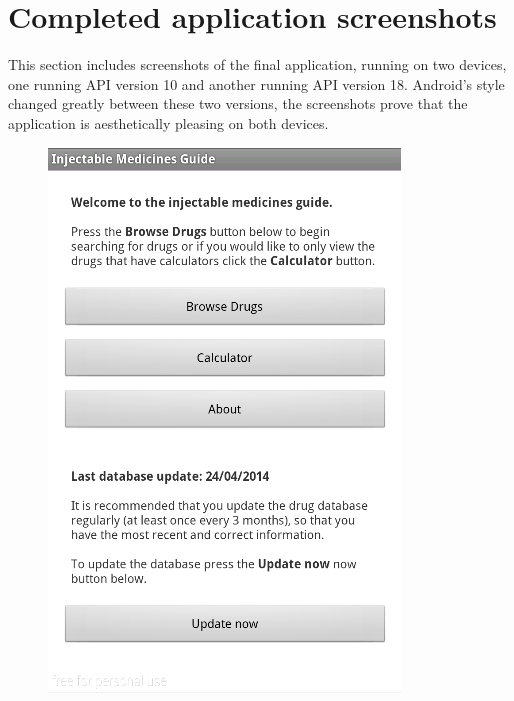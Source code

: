 \section{Completed application screenshots}
This section includes screenshots of the final application, running on two devices, one running API version 10 and another running API version 18.  Android’s style changed greatly between these two versions, the screenshots prove that the application is aesthetically pleasing on both devices.

\begin{figure}[H]
\centering
\begin{minipage}{.5\textwidth}
  \centering
  \includegraphics[width=.8\linewidth]{Images/screenshots/API10/main.png}
\end{minipage}%
\begin{minipage}{.5\textwidth}
  \centering

\end{minipage}
\end{figure}
